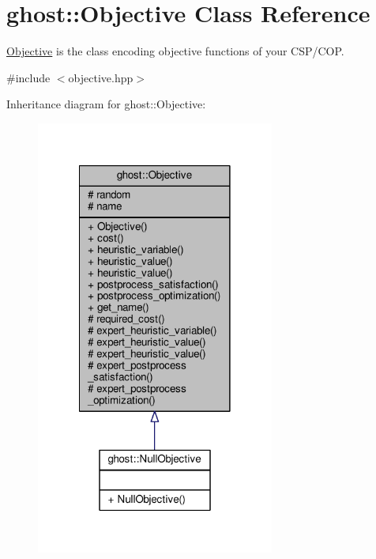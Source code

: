 \hypertarget{classghost_1_1Objective}{\section{ghost\-:\-:Objective Class Reference}
\label{classghost_1_1Objective}
}


\hyperlink{classghost_1_1Objective}{Objective} is the class encoding objective functions of your C\-S\-P/\-C\-O\-P.  




{\ttfamily \#include $<$objective.\-hpp$>$}



Inheritance diagram for ghost\-:\-:Objective\-:\nopagebreak
\begin{figure}[H]
\begin{center}
\leavevmode
\includegraphics[width=222pt]{classghost_1_1Objective__inherit__graph}
\end{center}
\end{figure}


